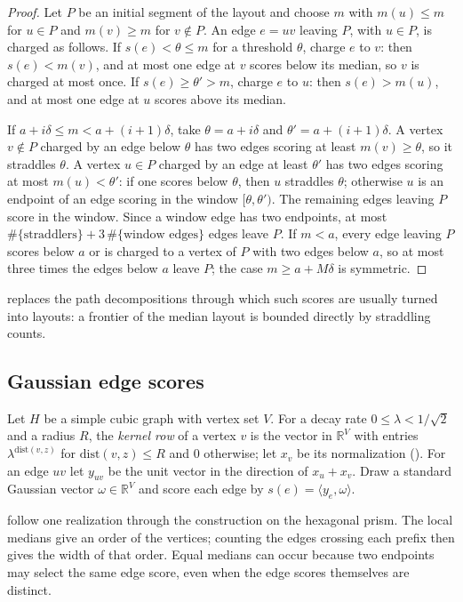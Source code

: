 \documentclass[11pt]{article}
\theoremstyle{plain}
\theoremstyle{definition}
\theoremstyle{remark}
\newcommand{\R}{\mathbb{R}}
\begin{document}
\begin{proof}
Let $P$ be an initial segment of the layout and choose $m$ with $m(u) \le m$ for $u \in P$ and
$m(v) \ge m$ for $v \notin P$. An edge $e = uv$ leaving $P$, with $u \in P$, is charged as
follows. If $s(e) < \theta \le m$ for a threshold $\theta$, charge $e$ to $v$: then
$s(e) < m(v)$, and at most one edge at $v$ scores below its median, so $v$ is charged at most
once. If $s(e) \ge \theta' > m$, charge $e$ to $u$: then $s(e) > m(u)$, and at most one edge at
$u$ scores above its median.

If $a + i\delta \le m < a + (i+1)\delta$, take $\theta = a + i\delta$ and
$\theta' = a + (i+1)\delta$. A vertex $v \notin P$ charged by an edge below $\theta$ has two
edges scoring at least $m(v) \ge \theta$, so it straddles $\theta$. A vertex $u \in P$ charged by
an edge at least $\theta'$ has two edges scoring at most $m(u) < \theta'$: if one scores below
$\theta$, then $u$ straddles $\theta$; otherwise $u$ is an endpoint of an edge scoring in the
window $[\theta, \theta')$. The remaining edges leaving $P$ score in the window. Since a window
edge has two endpoints, at most $\#\{\text{straddlers}\} + 3\,\#\{\text{window edges}\}$ edges
leave $P$. If $m < a$, every edge leaving $P$ scores below $a$ or is charged to a vertex of $P$
with two edges below $a$, so at most three times the edges below $a$ leave $P$; the case
$m \ge a + M\delta$ is symmetric.
\end{proof}

 replaces the path decompositions through which such scores are usually
turned into layouts: a frontier of the median layout is bounded directly by straddling counts.

\subsection{Gaussian edge scores}
\label{sec:gaussian}

Let $H$ be a simple cubic graph with vertex set $V$. For a decay rate $0 \le \lambda < 1/\sqrt2$
and a radius $R$, the \emph{kernel row} of a vertex $v$ is the vector in $\R^V$ with entries
$\lambda^{\mathrm{dist}(v, z)}$ for $\mathrm{dist}(v, z) \le R$ and $0$ otherwise; let $x_v$ be
its normalization (). For an edge $uv$ let $y_{uv}$ be the
unit vector in the direction of $x_u + x_v$. Draw a standard Gaussian vector $\omega \in \R^V$
and score each edge by $s(e) = \langle y_e, \omega\rangle$.

 follow one realization through the construction
on the hexagonal prism. The local medians give an order of the vertices; counting the edges crossing each
prefix then gives the width of that order. Equal medians can occur because two endpoints
may select the same edge score, even when the edge scores themselves are distinct.
\end{document}
